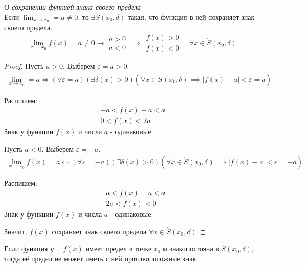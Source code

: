 \begin{theorem}
  \textit{О сохранении функией знака своего предела} \\
  Если $\lim_{x \to x_0} = a \neq 0$, то $\exists \mathring{S}(x_0, \delta)$ такая, что функция в ней сохраняет знак своего предела. \[
  \lim_{x \to x_0} f(x) = a \neq 0 \to 
  \begin{matrix}
    a > 0 \\
    a < 0
  \end{matrix}
  \implies 
  \begin{matrix}
    f(x) > 0 \\
    f(x) < 0
  \end{matrix}
  \quad
  \forall x \in \mathring{S}(x_0, \delta)
  \] 
\end{theorem}
\begin{proof}
  Пусть $a > 0$. Выберем  $\varepsilon = a > 0$.
  \begin{gather*}
    \lim_{x \to x_0} = a \iff (\forall \varepsilon = a)(\exists  \delta(x) > 0) (\forall x \in \mathring{S}(x_0, \delta) \implies |f(x)- a| < \varepsilon = a) 
  \end{gather*}

  Распишем:
  \begin{gather*}
    -a < f(x) - a < a \\
    \boxed{0 < f(x) < 2a}
  \end{gather*}
  Знак у функции $f(x)$ и числа $a$ - одинаковые.

  Пусть $a < 0$. Выберем  $\varepsilon = -a$.
  \begin{gather*}
    \lim_{x \to x_0} f(x) = a \iff (\forall \varepsilon = -a)(\exists  \delta(x) > 0) (\forall x \in \mathring{S}(x_0, \delta) \implies |f(x) - a| < \varepsilon = -a) 
  \end{gather*}

  Распишем:
  \begin{gather*}
    -a < f(x) - a < a \\
    \boxed{-2a < f(x) < 0}
  \end{gather*}
  Знак у функции $f(x)$ и числа  $a$ - одинаковые.

  Значит, $f(x)$ сохраняет знак своего предела  $\forall x \in \mathring{S}(x_0, \delta)$ 
\end{proof}

\begin{corollary}
  Если функция $y = f(x)$ имеет предел в точке  $x_0$ и знакопостояна в $\mathring{S}(x_0, \delta)$, тогда её предел не может иметь с ней противоположные знак.
\end{corollary}

